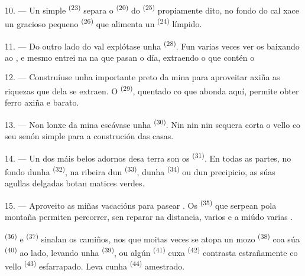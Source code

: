 10. --- Un simple  \textsuperscript{(23)} separa o 
\textsuperscript{(20)} do  \textsuperscript{(25)} propiamente dito, no
fondo do cal xace un gracioso  pequeno \textsuperscript{(26)} que
alimenta un  \textsuperscript{(24)} límpido.

11. --- Do outro lado do val explótase unha 
\textsuperscript{(28)}. Fun varias veces ver os  baixando ao
, e mesmo entrei na  na que pasan o día, extraendo o
 que contén o 

12. --- Construíuse unha importante  preto da mina para aproveitar
axiña as riquezas que dela se extraen. O  \textsuperscript{(29)},
quentado co  que abonda aquí, permite obter ferro
 axiña e barato.

13. --- Non lonxe da mina escávase unha  \textsuperscript{(30)}. Nin
 nin  nin sequera  corta o vello
 co seu  senón simple 
para a construción das casas.

14. --- Un dos máis belos adornos desa terra son os 
\textsuperscript{(31)}. En todas as partes, no fondo dunha 
\textsuperscript{(32)}, na ribeira dun  \textsuperscript{(33)},
dunha  \textsuperscript{(34)} ou dun precipicio, as súas agullas
delgadas botan matices verdes.

\VUsaut{3.0mm}
\VUsaut{3.0mm}

15. --- Aproveito as miñas vacacións para pasear . Os 
\textsuperscript{(35)} que serpean pola montaña permiten percorrer, sen reparar na
distancia, varios  e a miúdo varias .

 \textsuperscript{(36)} e 
\textsuperscript{(37)} sinalan os camiños, nos que moitas veces se atopa un mozo
 \textsuperscript{(38)} coa súa 
\textsuperscript{(40)} ao lado, levando unha 
\textsuperscript{(39)}, ou algún  \textsuperscript{(41)} cuxa
 \textsuperscript{(42)} contrasta estrañamente co vello
 \textsuperscript{(43)} esfarrapado. Leva cunha 
\textsuperscript{(44)} amestrado.

